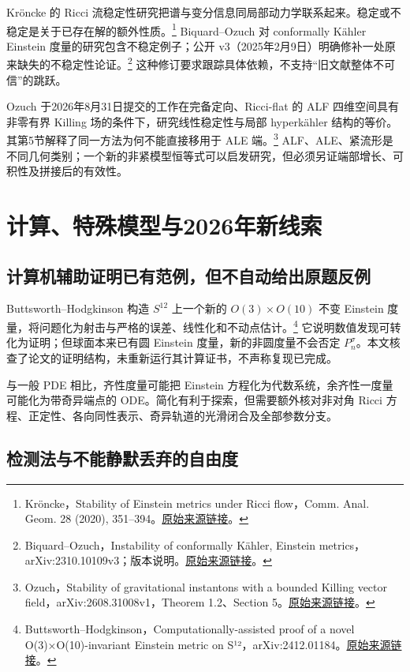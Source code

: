 \documentclass[11pt,a4paper]{article}
\theoremstyle{definition}
\newcommand{\src}[3]{\footnote{\raggedright #1，#2。\href{#3}{原始来源链接}。}}
\begin{document}
Kröncke 的 Ricci 流稳定性研究把谱与变分信息同局部动力学联系起来。稳定或不稳定是关于已存在解的额外性质。\src{Kröncke}{Stability of Einstein metrics under Ricci flow，Comm. Anal. Geom. 28 (2020), 351--394}{https://doi.org/10.4310/CAG.2020.v28.n2.a5}
Biquard--Ozuch 对 conformally Kähler Einstein 度量的研究包含不稳定例子；公开 v3（2025年2月9日）明确修补一处原来缺失的不稳定性论证。\src{Biquard--Ozuch}{Instability of conformally Kähler, Einstein metrics，arXiv:2310.10109v3；版本说明}{https://arxiv.org/abs/2310.10109v3}
这种修订要求跟踪具体依赖，不支持“旧文献整体不可信”的跳跃。

Ozuch 于2026年8月31日提交的工作在完备定向、Ricci-flat 的 ALF 四维空间具有非零有界 Killing 场的条件下，研究线性稳定性与局部 hyperkähler 结构的等价。其第5节解释了同一方法为何不能直接移用于 ALE 端。\src{Ozuch}{Stability of gravitational instantons with a bounded Killing vector field，arXiv:2608.31008v1，Theorem 1.2、Section 5}{https://arxiv.org/html/2608.31008v1}
ALF、ALE、紧流形是不同几何类别；一个新的非紧模型恒等式可以启发研究，但必须另证端部增长、可积性及拼接后的有效性。

\section{计算、特殊模型与2026年新线索}

\subsection{计算机辅助证明已有范例，但不自动给出原题反例}

Buttsworth--Hodgkinson 构造 $S^{12}$ 上一个新的 $O(3)\times O(10)$ 不变 Einstein 度量，将问题化为射击与严格的误差、线性化和不动点估计。\src{Buttsworth--Hodgkinson}{Computationally-assisted proof of a novel O(3)×O(10)-invariant Einstein metric on S¹²，arXiv:2412.01184}{https://arxiv.org/abs/2412.01184}
它说明数值发现可转化为证明；但球面本来已有圆 Einstein 度量，新的非圆度量不会否定 $P_n^\sigma$。本文核查了论文的证明结构，未重新运行其计算证书，不声称复现已完成。

与一般 PDE 相比，齐性度量可能把 Einstein 方程化为代数系统，余齐性一度量可能化为带奇异端点的 ODE。简化有利于探索，但需要额外核对非对角 Ricci 方程、正定性、各向同性表示、奇异轨道的光滑闭合及全部参数分支。

\subsection{检测法与不能静默丢弃的自由度}
\end{document}
